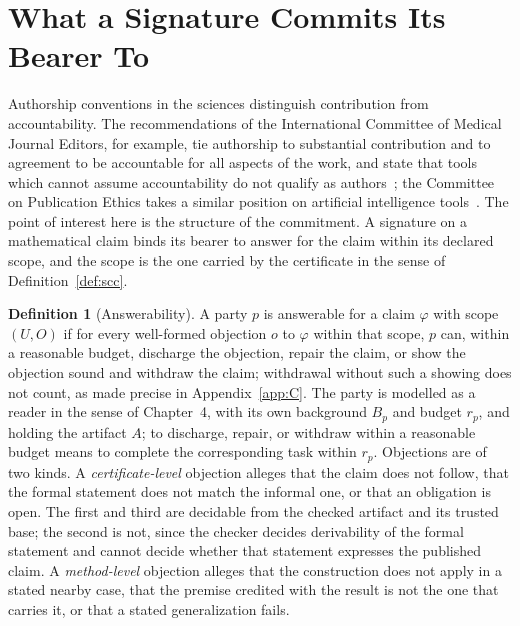 \documentclass[11pt]{book}
\theoremstyle{definition}
\newtheorem{definition}[theorem]{Definition}
\theoremstyle{remark}
\begin{document}
\section{What a Signature Commits Its Bearer To}

Authorship conventions in the sciences distinguish contribution from accountability. The recommendations of the International Committee of Medical Journal Editors, for example, tie authorship to substantial contribution and to agreement to be accountable for all aspects of the work, and state that tools which cannot assume accountability do not qualify as authors~\cite{icmje}; the Committee on Publication Ethics takes a similar position on artificial intelligence tools~\cite{cope}. The point of interest here is the structure of the commitment. A signature on a mathematical claim binds its bearer to answer for the claim within its declared scope, and the scope is the one carried by the certificate in the sense of Definition~\ref{def:scc}.

\begin{definition}[Answerability]
A party $p$ is answerable for a claim $\varphi$ with scope $(U,O)$ if for every well-formed objection $o$ to $\varphi$ within that scope, $p$ can, within a reasonable budget, discharge the objection, repair the claim, or show the objection sound and withdraw the claim; withdrawal without such a showing does not count, as made precise in Appendix~\ref{app:C}. The party is modelled as a reader in the sense of Chapter~4, with its own background $B_p$ and budget $r_p$, and holding the artifact $A$; to discharge, repair, or withdraw within a reasonable budget means to complete the corresponding task within $r_p$. Objections are of two kinds. A \emph{certificate-level} objection alleges that the claim does not follow, that the formal statement does not match the informal one, or that an obligation is open. The first and third are decidable from the checked artifact and its trusted base; the second is not, since the checker decides derivability of the formal statement and cannot decide whether that statement expresses the published claim. A \emph{method-level} objection alleges that the construction does not apply in a stated nearby case, that the premise credited with the result is not the one that carries it, or that a stated generalization fails.
\end{definition}
\end{document}
